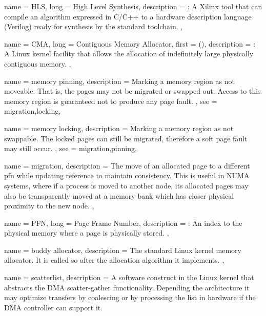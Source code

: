 {
	name = {HLS},
	long = {High Level Synthesis},
	description = {\emph{}:
		A Xilinx tool that can compile an algorithm expressed in C/C++ to 
		a hardware description language (Verilog) ready for synthesis by
		the standard toolchain.
	},
}


{
	name = {CMA},
	long = {Contiguous Memory Allocator},
	first = { ()},
	description = {	\emph{}:
		A Linux kernel facility that allows the allocation of indefinitely large physically
		contiguous memory.
	},
}

{
	name = {memory pinning},
	description = {
		Marking a memory region as not moveable. That is, the pages may not be migrated or swapped out.
		Access to this memory region is guaranteed not to produce any page fault.
	},
	see = {migration,locking},
}

{
	name = {memory locking},
	description = {
		Marking a memory region as not swappable. The locked pages can still be migrated, therefore
		a soft page fault may still occur.
	},
	see = {migration,pinning},
}

{
	name = {migration},
	description = {
		The move of an allocated page to a different \gls{pfn} while updating reference to maintain
		consistency. This is useful in NUMA systems, where if a process is moved to another node,
		its allocated pages may also be transparently moved at a memory bank
		which has closer physical proximity to the new node.
	},
}

{
	name = {PFN},
	long = {Page Frame Number},
	description = {\emph{}:
		An index to the physical memory where a page is physically stored.
	},
}

{
	name = {buddy allocator},
	description = {
		The standard Linux kernel memory allocator. It is called so after the allocation algorithm
		it implements.
	},
}

{
	name = {scatterlist},
	description = {
		A software construct in the Linux kernel that abstracts the DMA scatter-gather functionality.
		Depending the architecture it may optimize transfers by coalescing or by processing the list
		in hardware if the DMA controller can support it.
	}
}

